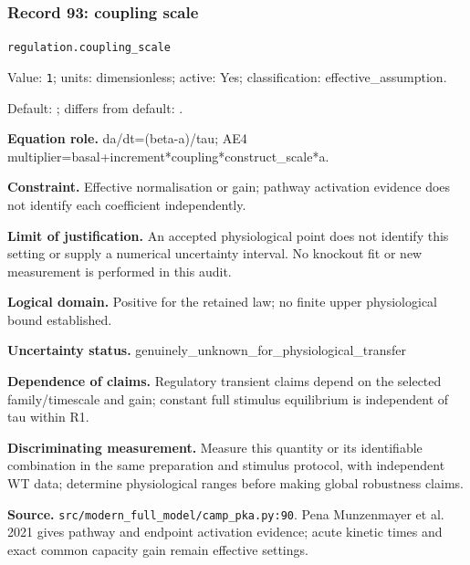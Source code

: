 \subsubsection*{Record 93: coupling scale}
{\small \nolinkurl{regulation.coupling_scale}\par

Value: \texttt{1}; units: dimensionless; active: Yes; classification: effective\_assumption.\par

Default: ; differs from default: .\par

\textbf{Equation role.} da/dt=(beta-a)/tau; AE4 multiplier=basal+increment*coupling*construct\_scale*a.\par

\textbf{Constraint.} Effective normalisation or gain; pathway activation evidence does not identify each coefficient independently.\par

\textbf{Limit of justification.} An accepted physiological point does not identify this setting or supply a numerical uncertainty interval. No knockout fit or new measurement is performed in this audit.\par

\textbf{Logical domain.} Positive for the retained law; no finite upper physiological bound established.\par

\textbf{Uncertainty status.} genuinely\_unknown\_for\_physiological\_transfer\par

\textbf{Dependence of claims.} Regulatory transient claims depend on the selected family/timescale and gain; constant full stimulus equilibrium is independent of tau within R1.\par

\textbf{Discriminating measurement.} Measure this quantity or its identifiable combination in the same preparation and stimulus protocol, with independent WT data; determine physiological ranges before making global robustness claims.\par

\textbf{Source.} \nolinkurl{src/modern_full_model/camp_pka.py:90}. Pena Munzenmayer et al. 2021 gives pathway and endpoint activation evidence; acute kinetic times and exact common capacity gain remain effective settings.\par}

